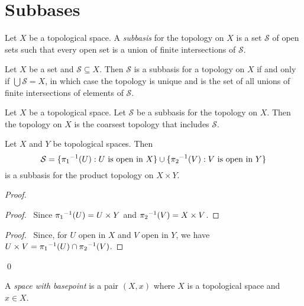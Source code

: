 \section{Subbases}

\begin{df}[Subbasis]
Let $X$ be a topological space. A \emph{subbasis} for the topology on $X$ is a set $\mathcal{S}$ of open sets such that every open set is a union of finite intersections of $\mathcal{S}$.
\end{df}

\begin{prop}
Let $X$ be a set and $\mathcal{S} \subseteq X$. Then $\mathcal{S}$ is a subbasis for a topology on $X$ if and only if $\bigcup \mathcal{S} = X$, in which case the topology is unique and is the set of all unions of finite intersections of elements of $\mathcal{S}$.
\end{prop}

\begin{prop}
Let $X$ be a topological space.
Let $\mathcal{S}$ be a subbasis for the topology on $X$.
Then the topology on $X$ is the coarsest topology that includes $\mathcal{S}$.
\end{prop}


\begin{prop}
Let $X$ and $Y$ be topological spaces. Then
\[ \mathcal{S} = \{ {\pi_1}^{-1}(U) : U \text{ is open in } X \} \cup \{ {\pi_2}^{-1}(V) : V \text{ is open in } Y \} \]
is a subbasis for the product topology on $X \times Y$.
\end{prop}

\begin{proof}
\pf
{}
\begin{proof}
	\pf\ Since ${\pi_1}^{-1}(U) = U \times Y$ and ${\pi_2}^{-1}(V) = X \times V$.
\end{proof}
\begin{proof}
	\pf\ Since, for $U$ open in $X$ and $V$ open in $Y$, we have $U \times V = {\pi_1}^{-1}(U) \cap {\pi_2}^{-1}(V)$.
\end{proof}
\qed
\end{proof}

\begin{df}
A \emph{space with basepoint} is a pair $(X,x)$ where $X$ is a topological space and $x \in X$.
\end{df}

